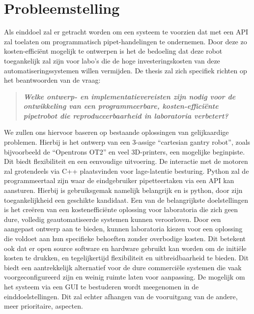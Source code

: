\section{Probleemstelling}
Als einddoel zal er getracht worden om een systeem te voorzien dat met een API zal toelaten om programmatisch pipet-handelingen te ondernemen. Door deze zo kosten-efficiënt mogelijk te ontwerpen is het de bedoeling dat deze robot toegankelijk zal zijn voor labo’s die de hoge investeringskosten van deze automatiseringssystemen willen vermijden. De thesis zal zich specifiek richten op het beantwoorden van de vraag:
\begin{quote}
    \begin{center}
        \textbf{\textit{Welke ontwerp- en implementatievereisten zijn nodig voor de ontwikkeling van een programmeerbare, kosten-efficiënte pipetrobot die reproduceerbaarheid in laboratoria verbetert?}}
    \end{center}
\end{quote}
We zullen ons hiervoor baseren op bestaande oplossingen van gelijkaardige problemen. Hierbij is het ontwerp van een 3-assige “cartesian gantry robot”, zoals bijvoorbeeld de “Opentrons OT2” en veel 3D-printers, een mogelijke beginpiste. Dit biedt flexibiliteit en een eenvoudige uitvoering. De interactie met de motoren zal grotendeels via C++ plaatsvinden voor lage-latentie besturing. Python zal de programmeertaal zijn waar de eindgebruiker pipetteertaken via een API kan aansturen. Hierbij is gebruiksgemak namelijk belangrijk en is python, door zijn toegankelijkheid een geschikte kandidaat.
Een van de belangrijkste doelstellingen is het creëren van een kostenefficiënte oplossing voor laboratoria die zich geen dure, volledig geautomatiseerde systemen kunnen veroorloven. Door een aangepast ontwerp aan te bieden, kunnen laboratoria kiezen voor een oplossing die voldoet aan hun specifieke behoeften zonder overbodige kosten. Dit betekent ook dat er open source software en hardware gebruikt kan worden om de initiële kosten te drukken, en tegelijkertijd flexibiliteit en uitbreidbaarheid te bieden. Dit biedt een aantrekkelijk alternatief voor de dure commerciële systemen die vaak voorgeconfigureerd zijn en weinig ruimte laten voor aanpassing. De mogelijk om het systeem via een GUI te bestuderen wordt meegenomen in de einddoelstellingen. Dit zal echter afhangen van de vooruitgang van de andere, meer prioritaire, aspecten.